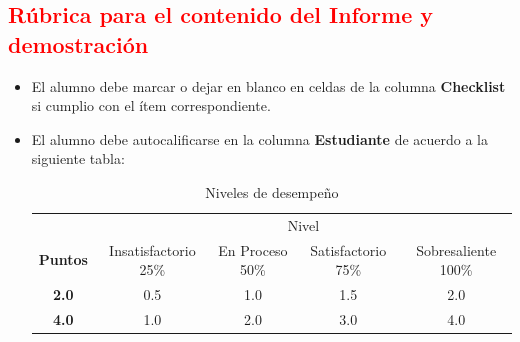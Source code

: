 \documentclass{article}
\begin{document}
	\clearpage
	
	\subsection{\textcolor{red}{Rúbrica para el contenido del Informe y demostración}}
	\begin{itemize}			
		\item El alumno debe marcar o dejar en blanco en celdas de la columna \textbf{Checklist} si cumplio con el ítem correspondiente.
		\item El alumno debe autocalificarse en la columna \textbf{Estudiante} de acuerdo a la siguiente tabla:
	
		\begin{table}[ht]
			\caption{Niveles de desempeño}
			\begin{center}
			\begin{tabular}{ccccc}
    			\hline
    			 & \multicolumn{4}{c}{Nivel}\\
    			\cline{1-5}
    			\textbf{Puntos} & Insatisfactorio 25\%& En Proceso 50\% & Satisfactorio 75\% & Sobresaliente 100\%\\
    			\textbf{2.0}&0.5&1.0&1.5&2.0\\
    			\textbf{4.0}&1.0&2.0&3.0&4.0\\
    		\hline
			\end{tabular}
		\end{center}
	\end{table}	
	
	\end{itemize}
	
\end{document}
